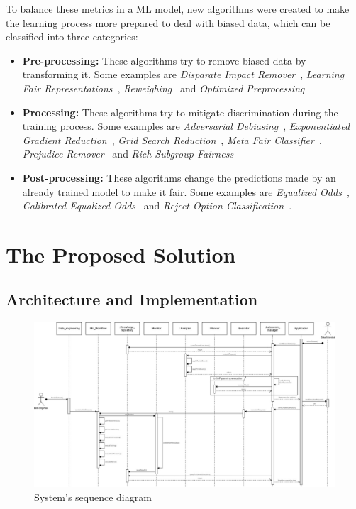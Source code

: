 \documentclass[sigconf]{acmart}
\begin{document}
To balance these metrics in a ML model, new algorithms were created to make the learning process more prepared to deal with biased data, which can be classified into three categories: 

\begin{itemize}
\item \textbf{Pre-processing:} These algorithms try to remove biased data by transforming it. Some examples are \textit{Disparate Impact Remover}~\citep{Feldman_2015}, \textit{Learning Fair Representations}~\citep{Zemel_2013}, \textit{Reweighing}~\citep{Kamiran_2011} and \textit{Optimized Preprocessing}~\citep{Calmon_2017}
\item \textbf{Processing:} These algorithms try to mitigate discrimination during the training process. Some examples are \textit{Adversarial Debiasing}~\citep{Zhang_2018}, \textit{Exponentiated Gradient Reduction}~\citep{Agarwal_2018}, \textit{Grid Search Reduction}~\citep{Agarwal_2019}, \textit{Meta Fair Classifier}~\citep{Celis_2019}, \textit{Prejudice Remover}~\citep{Kamishima_2012} and \textit{Rich Subgroup Fairness}~\citep{Kearns_2018}
\item \textbf{Post-processing:} These algorithms change the predictions made by an already trained model to make it fair. Some examples are \textit{Equalized Odds}~\citep{Hardt_2016}, \textit{Calibrated Equalized Odds}~\citep{Pleiss_2017} and \textit{Reject Option Classification}~\citep{Kamiran_2012}.
\end{itemize}

\section{The Proposed Solution}

\subsection{Architecture and Implementation}

\begin{figure}
\clearpage
\includegraphics[scale=0.425]{images/Diagrama_Sequencia-eng.jpg}
\caption {System's sequence diagram}
\label{fig:DiagramaSequencia}
\end{figure}
\end{document}
